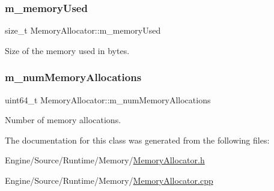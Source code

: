 \subsubsection{\texorpdfstring{m\+\_\+memory\+Used}{m\_memoryUsed}}
{\footnotesize\ttfamily size\+\_\+t Memory\+Allocator\+::m\+\_\+memory\+Used\hspace{0.3cm}{\ttfamily [protected]}}

Size of the memory used in bytes. \mbox{\label{class_memory_allocator_a0fbd7580dfb92e7e5ba20c44658df574}} 
\subsubsection{\texorpdfstring{m\+\_\+num\+Memory\+Allocations}{m\_numMemoryAllocations}}
{\footnotesize\ttfamily uint64\+\_\+t Memory\+Allocator\+::m\+\_\+num\+Memory\+Allocations\hspace{0.3cm}{\ttfamily [protected]}}

Number of memory allocations. 

The documentation for this class was generated from the following files\+:\begin{DoxyCompactItemize}
\item 
Engine/\+Source/\+Runtime/\+Memory/\mbox{\hyperlink{_memory_allocator_8h}{Memory\+Allocator.\+h}}\item 
Engine/\+Source/\+Runtime/\+Memory/\mbox{\hyperlink{_memory_allocator_8cpp}{Memory\+Allocator.\+cpp}}\end{DoxyCompactItemize}
